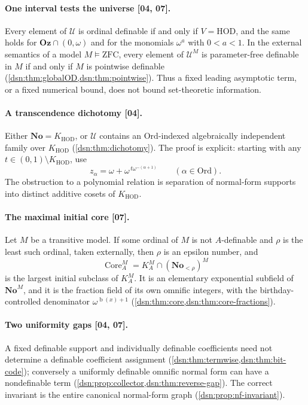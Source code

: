 \documentclass[11pt,a4paper]{article}
\numberwithin{equation}{section}
\theoremstyle{definition}
\theoremstyle{remark}
\newcommand{\No}{\mathbf{No}}
\newcommand{\Oz}{\mathbf{Oz}}
\newcommand{\Ord}{\mathrm{Ord}}
\newcommand{\HOD}{\mathrm{HOD}}
\newcommand{\ZFC}{\mathrm{ZFC}}
\newcommand{\bd}{\operatorname{b}}
\newcommand{\Core}{\operatorname{Core}}
\newcommand{\Cell}{\mathcal U}
\newcommand{\KH}{K_{\HOD}}
\newcommand{\src}[1]{\textup{\textsf{\small[#1]}}}
\begin{document}
\paragraph{One interval tests the universe \src{04, 07}.}
Every element of $\Cell$ is ordinal definable if and only if $V=\HOD$, and
the same holds for $\Oz\cap(0,\omega)$ and for the monomials $\omega^a$
with $0<a<1$. In the external semantics of a model $M\models\ZFC$, every
element of $\Cell^M$ is parameter-free definable in $M$ if and only if $M$
is pointwise definable (\cref{dsn:thm:globalOD,dsn:thm:pointwise}). Thus a
fixed leading asymptotic term, or a fixed numerical bound, does not bound
set-theoretic information.

\paragraph{A transcendence dichotomy \src{04}.}
Either $\No=\KH$, or $\Cell$ contains an $\Ord$-indexed algebraically
independent family over $\KH$ (\cref{dsn:thm:dichotomy}). The proof is
explicit: starting with any $t\in(0,1)\setminus\KH$, use
\begin{equation}\label{dsn:eq:introfam}
 z_\alpha=\omega+\omega^{\,t\omega^{-(\alpha+1)}}
 \qquad(\alpha\in\Ord).
\end{equation}
The obstruction to a polynomial relation is separation of normal-form
supports into distinct additive cosets of $\KH$.

\paragraph{The maximal initial core \src{07}.}
Let $M$ be a transitive model. If some ordinal of $M$ is not
$A$-definable and $\rho$ is the least such ordinal, taken externally, then
$\rho$ is an epsilon number, and
\[
 \Core^M_A=K^M_A\cap(\No_{<\rho})^M
\]
is the largest initial subclass of $K^M_A$. It is an elementary
exponential subfield of $\No^M$, and it is the fraction field of its own
omnific integers, with the birthday-controlled denominator
$\omega^{\bd(x)+1}$ (\cref{dsn:thm:core,dsn:thm:core-fractions}).

\paragraph{Two uniformity gaps \src{04, 07}.}
A fixed definable support and individually definable coefficients need not
determine a definable coefficient assignment
(\cref{dsn:thm:termwise,dsn:thm:bit-code}); conversely a uniformly
definable omnific normal form can have a nondefinable term
(\cref{dsn:prop:collector,dsn:thm:reverse-gap}). The correct invariant is
the entire canonical normal-form graph (\cref{dsn:prop:nf-invariant}).
\end{document}
